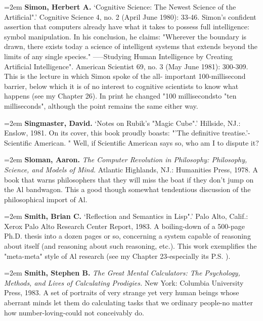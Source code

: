 \par\noindent\hangindent=2em {\bf Simon, Herbert A.} `Cognitive Science: The Newest Science of the Artificial".' Cognitive Science 4, no. 2 (April June 1980): 33-46. Simon's confident assertion that computers already have what it takes to possess full intelligence: symbol manipulation. In his conclusion, he claims: "Wherever the boundary is drawn, there exists today a science of intelligent systems that extends beyond the limits of any single species." -----Studying Human Intelligence by Creating Artificial Intelligence". American Scientist 69, no. 3 (May June 1981): 300-309. This is the lecture in which Simon spoke of the all- important 100-millisecond barrier, below which it is of no interest to cognitive scientists to know what happens (see my Chapter 26). In print he changed "100 millisecondsto "ten milliseconds", although the point remains the same either way.

\par\noindent\hangindent=2em {\bf Singmaster, David.} `Notes on Rubik's "Magic Cube".' Hillside, NJ.: Enslow, 1981. On its cover, this book proudly boasts: "'The definitive treatise.'-Scientific American. " Well, if Scientific American says so, who am I to dispute it?

\par\noindent\hangindent=2em {\bf Sloman, Aaron.} {\it The Computer Revolution in Philosophy: Philosophy, Science, and Models of Mind.} Atlantic Highlands, NJ.: Humanities Press, 1978. A book that warns philosophers that they will miss the boat if they don't jump on the Al bandwagon. This a good though somewhat tendentious discussion of the philosophical import of Al.

\par\noindent\hangindent=2em {\bf Smith, Brian C.} `Reflection and Semantics in Lisp".' Palo Alto, Calif.: Xerox Palo Alto Research Center Report, 1983. A boiling-down of a 500-page Ph.D. thesis into a dozen pages or so, concerning a system capable of reasoning about itself (and reasoning about such reasoning, etc.). This work exemplifies the "meta-meta" style of Al research (see my Chapter 23-especially its P.S. ).

\par\noindent\hangindent=2em {\bf Smith, Stephen B.} {\it The Great Mental Calculators: The Psychology, Methods, and Lives of Calculating Prodigies.} New York: Columbia University Press, 1983. A set of portraits of very strange yet very human beings whose aberrant minds let them do calculating tasks that we ordinary people-no matter how number-loving-could not conceivably do.

